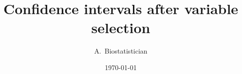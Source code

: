 \usepackage{graphicx}
\usepackage{booktabs}
\usepackage{amsmath}
\usepackage[margin=1in]{geometry}
\usepackage{setspace}

\title{Confidence intervals after variable selection}
\author{A.\ Biostatistician}
\date{\today}
